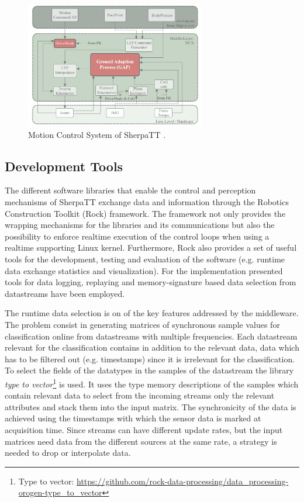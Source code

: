 \documentclass{article}
\begin{document}
\begin{figure}[h]
\centering
\includegraphics[width=0.7\textwidth]{../figures/MCS-Structure.pdf}
\caption{\label{fig:MCS}Motion Control System of SherpaTT \cite{cordes_phd_2018}.}
\end{figure}





\subsection{Development Tools}

The different software libraries that enable the control and perception mechanisms of SherpaTT exchange data and information through the Robotics Construction Toolkit (Rock) framework.
The framework not only provides the wrapping mechanisms for the libraries and its communications but also the possibility to enforce realtime execution of the control loops when using a realtime supporting Linux kernel.
Furthermore, Rock also provides a set of useful tools for the development, testing and evaluation of the software (e.g. runtime data exchange statistics and visualization). 
For the implementation presented tools for data logging, replaying and memory-signature based data selection from datastreams have been employed.

The runtime data selection is on of the key features addressed by the middleware. 
The problem consist in generating matrices of synchronous sample values for classification online from datastreams with multiple frequencies.
Each datastream relevant for the classification contains in addition to the relevant data, data which has to be filtered out (e.g. timestamps) since it is irrelevant for the classification.
To select the fields of the datatypes in the samples of the datastream the library \emph{type to vector}\footnote{Type to vector: \url{https://github.com/rock-data-processing/data_processing-orogen-type_to_vector}} is used.
It uses the type memory descriptions of the samples which contain relevant data to select from the incoming streams only the relevant attributes and stack them into the input matrix. 
The synchronicity of the data is achieved using the timestamps with which the sensor data is marked at acquisition time.
Since streams can have different update rates, but the input matrices need data from the different sources at the same rate, a strategy is needed to drop or interpolate data. 
\end{document}
